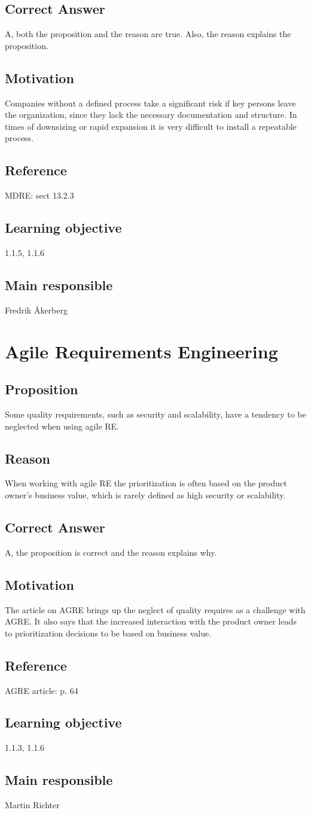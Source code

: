 \documentclass[a4paper]{article}
\begin{document}
\subsection*{Correct Answer}
A, both the proposition and the reason are true. Also, the reason explains the proposition.
\subsection*{Motivation}
Companies without a defined process take a significant risk if key persons leave the organization, since they lack the necessary documentation and structure. In times of downsizing or rapid expansion it is very difficult to install a repeatable process.
\subsection*{Reference}
MDRE: sect 13.2.3
\subsection*{Learning objective}
1.1.5, 1.1.6
\subsection*{Main responsible}
Fredrik Åkerberg
 
\section{Agile Requirements Engineering}
\subsection*{Proposition}
Some quality requirements, such as security and scalability, have a tendency to be neglected when using agile RE. 
\subsection*{Reason}
When working with agile RE the prioritization is often based on the product owner's business value, which is rarely defined as high security or scalability.
\subsection*{Correct Answer}
A, the proposition is correct and the reason explains why.
\subsection*{Motivation}
The article on AGRE brings up the neglect of quality requires as a challenge with AGRE. It also says that the increased interaction with the product owner leads to prioritization decisions to be based on business value.
\subsection*{Reference}
AGRE article: p. 64
\subsection*{Learning objective}
1.1.3, 1.1.6
\subsection*{Main responsible}
Martin Richter
\end{document}
